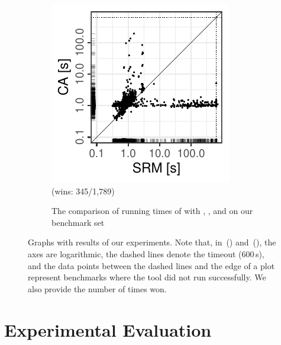 \documentclass[acmsmall,screen]{acmart}
\begin{document}
{\begin{figure}[t]
\begin{subfigure}[b]{\linewidth}
\begin{center}
  \begin{minipage}{\triplepiclen}
  \begin{center}
  \includegraphics[width=1\triplepiclen,keepaspectratio]{figures/srm-vs-cad.pdf}\\
    \hspace*{5mm}
    (\catool wins: 345/1,789)
  \end{center}
  \end{minipage}
\end{center}
\caption{The comparison of running times of \catool with \grep, \dotnet, and \srm on our benchmark set}
\label{fig:ca-vs-tools}
\end{subfigure}

\vspace*{-1mm}
\caption{Graphs with results of our experiments.
  Note that, in~() and~(), the axes
  are logarithmic, the dashed lines denote the timeout (600\,s), and
  the data points between the dashed lines and the edge of a plot represent
  benchmarks where the tool did not run successfully.
  We also
  provide the number of times \catool won.
}
\label{fig:graphs}
\vspace{-3mm}
\end{figure}
}


\section{Experimental Evaluation}\label{sec:experiments}
\end{document}
